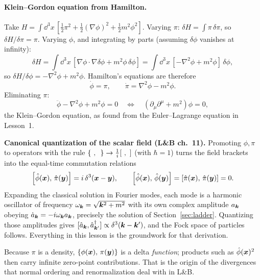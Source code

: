 \documentclass[11pt]{article}
\begin{document}
\paragraph{Klein--Gordon equation from Hamilton.} Take $H=\int\dd^3x\,[\tfrac12\pi^2+\tfrac12(\nabla\phi)^2+\tfrac12m^2\phi^2]$. Varying $\pi$: $\delta H=\int\pi\,\delta\pi$, so $\delta H/\delta\pi=\pi$. Varying $\phi$, and integrating by parts (assuming $\delta\phi$ vanishes at infinity):
\begin{equation}
 \delta H=\int\dd^3x\,[\nabla\phi\cdot\nabla\delta\phi+m^2\phi\,\delta\phi]=\int\dd^3x\,[-\nabla^2\phi+m^2\phi]\,\delta\phi,
\end{equation}
so $\delta H/\delta\phi=-\nabla^2\phi+m^2\phi$. Hamilton's equations are therefore
\begin{equation}
 \dot\phi=\pi,\qquad\dot\pi=\nabla^2\phi-m^2\phi .
\end{equation}
Eliminating $\pi$:
\begin{equation}
 \ddot\phi-\nabla^2\phi+m^2\phi=0\quad\Longleftrightarrow\quad(\partial_\mu\partial^\mu+m^2)\phi=0,
\end{equation}
the Klein--Gordon equation, as found from the Euler--Lagrange equation in Lesson~1.

\begin{qftbridge}
\textbf{Canonical quantization of the scalar field (L\&B ch.~11).} Promoting $\phi,\pi$ to operators with the rule $\pb{\ }{\ }\to\frac1{i}[\ ,\ ]$ (with $\hbar=1$) turns the field brackets into the equal-time commutation relations
\[
 \left[\hat\phi(\bm{x}),\,\hat\pi(\bm{y})\right]=i\,\delta^3(\bm{x}-\bm{y}),\qquad\left[\hat\phi(\bm{x}),\,\hat\phi(\bm{y})\right]=\left[\hat\pi(\bm{x}),\,\hat\pi(\bm{y})\right]=0 .
\]
Expanding the classical solution in Fourier modes, each mode is a harmonic oscillator of frequency $\omega_{\bm{k}}=\sqrt{\bm{k}^2+m^2}$ with its own complex amplitude $a_{\bm{k}}$ obeying $\dot a_{\bm{k}}=-i\omega_{\bm{k}}a_{\bm{k}}$, precisely the solution of Section~\ref{sec:ladder}. Quantizing those amplitudes gives $[\hat a_{\bm{k}},\hat a_{\bm{k}'}^\dagger]\propto\delta^3(\bm{k}-\bm{k}')$, and the Fock space of particles follows. Everything in this lesson is the groundwork for that derivation.
\end{qftbridge}

\begin{pitfall}
Because $\pi$ is a density, $\left\{\phi(\bm{x}),\,\pi(\bm{y})\right\}$ is a delta \emph{function}; products such as $\hat\phi(\bm{x})^2$ then carry infinite zero-point contributions. That is the origin of the divergences that normal ordering and renormalization deal with in L\&B.
\end{pitfall}
\end{document}
